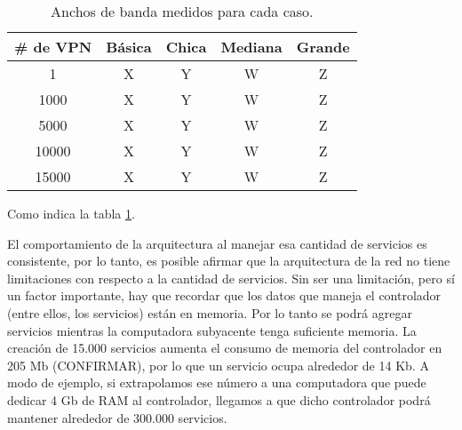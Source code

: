 \begin{table}[ht]
	\caption{Anchos de banda medidos para cada caso.}
	\centering 
	\begin{tabular}{c c c c c}
		\hline\hline
		\# de VPN & Básica & Chica & Mediana  & Grande \\ [0.5ex]
		\hline
		1 & X & Y & W & Z \\
		1000 & X & Y & W & Z  \\
		5000 & X & Y & W & Z \\
		10000 & X & Y & W & Z \\
		15000 & X & Y & W & Z \\ [1ex]
		\hline
	\end{tabular}
	\label{table:escala_de_servicios}
\end{table}

Como indica la tabla \ref{table:escala_de_servicios}.

El comportamiento de la arquitectura al manejar esa cantidad de servicios es consistente, por lo tanto, es posible afirmar que la arquitectura de la red no tiene limitaciones con respecto a la cantidad de servicios. Sin ser una limitación, pero sí un factor importante, hay que recordar que los datos que maneja el controlador (entre ellos, los servicios) están en memoria. Por lo tanto se podrá agregar servicios mientras la computadora subyacente tenga suficiente memoria. La creación de 15.000 servicios aumenta el consumo de memoria del controlador en 205 Mb (CONFIRMAR), por lo que un servicio ocupa alrededor de 14 Kb. A modo de ejemplo, si extrapolamos ese número a una computadora que puede dedicar 4 Gb de RAM al controlador, llegamos a que dicho controlador podrá mantener alrededor de 300.000 servicios.



